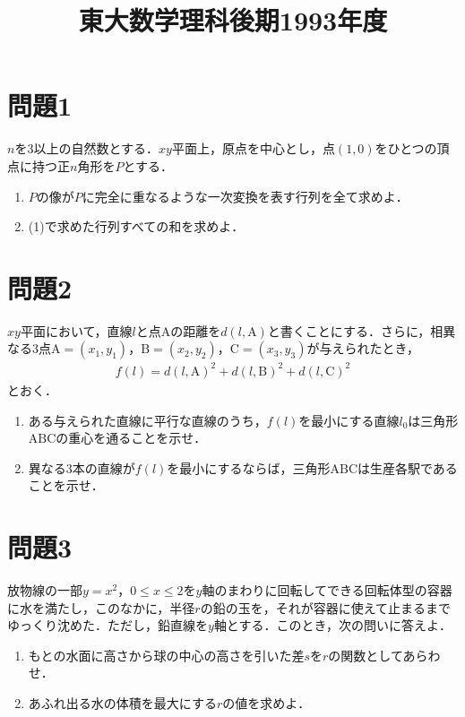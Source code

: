 \documentclass[unicode,12pt, A4j]{ltjsarticle}%
\title{東大数学理科後期1993年度}
\author{}
\date{}
\begin{document}
\maketitle

\section{問題1}
$n$を$3$以上の自然数とする．$xy$平面上，原点を中心とし，点$(1,0)$をひとつの頂点に持つ正$n$角形を$P$とする．
\begin{enumerate}
 \item $P$の像が$P$に完全に重なるような一次変換を表す行列を全て求めよ．
 \item (1)で求めた行列すべての和を求めよ．
\end{enumerate}

\section{問題2}
$xy$平面において，直線$l$と点$\mathrm{A}$の距離を$d(l,\mathrm{A})$と書くことにする．さらに，相異なる$3$点$\mathrm{A}=(x_1,y_1)$，$\mathrm{B}=(x_2,y_2)$，$\mathrm{C}=(x_3,y_3)$が与えられたとき，
\begin{align*}
 f(l)=d(l,\mathrm{A})^2+d(l,\mathrm{B})^2+d(l,\mathrm{C})^2
\end{align*}
とおく．

\begin{enumerate}
 \item ある与えられた直線に平行な直線のうち，$f(l)$を最小にする直線$l_0$は三角形$\mathrm{ABC}$の重心を通ることを示せ．
 \item 異なる$3$本の直線が$f(l)$を最小にするならば，三角形$\mathrm{ABC}$は生産各駅であることを示せ．
\end{enumerate}

\section{問題3}
放物線の一部$y=x^2$，$0\le x\le 2$を$y$軸のまわりに回転してできる回転体型の容器に水を満たし，このなかに，半径$r$の鉛の玉を，それが容器に使えて止まるまでゆっくり沈めた．ただし，鉛直線を$y$軸とする．このとき，次の問いに答えよ．
\begin{enumerate}
 \item もとの水面に高さから球の中心の高さを引いた差$s$を$r$の関数としてあらわせ．
 \item あふれ出る水の体積を最大にする$r$の値を求めよ．
\end{enumerate}
\end{document}
